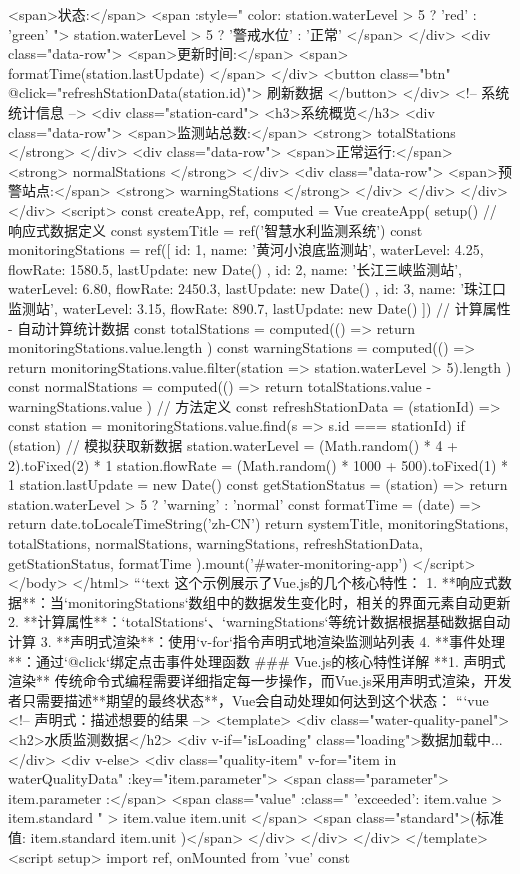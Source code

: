 {{{{{<span>状态:</span> <span :style="{ color: station.waterLevel > 5 ? 'red' : 'green' }"> {{ station.waterLevel > 5 ? '警戒水位' : '正常' }} </span> </div> <div class="data-row"> <span>更新时间:</span> <span>{{ formatTime(station.lastUpdate) }}</span> </div> <button class="btn" @click="refreshStationData(station.id)"> 刷新数据 </button> </div> <!-- 系统统计信息 --> <div class="station-card"> <h3>系统概览</h3> <div class="data-row"> <span>监测站总数:</span> <strong>{{ totalStations }}</strong> </div> <div class="data-row"> <span>正常运行:</span> <strong>{{ normalStations }}</strong> </div> <div class="data-row"> <span>预警站点:</span> <strong>{{ warningStations }}</strong> </div> </div> </div> </div> <script> const { createApp, ref, computed } = Vue createApp({ setup() { // 响应式数据定义 const systemTitle = ref('智慧水利监测系统') const monitoringStations = ref([ { id: 1, name: '黄河小浪底监测站', waterLevel: 4.25, flowRate: 1580.5, lastUpdate: new Date() }, { id: 2, name: '长江三峡监测站', waterLevel: 6.80, flowRate: 2450.3, lastUpdate: new Date() }, { id: 3, name: '珠江口监测站', waterLevel: 3.15, flowRate: 890.7, lastUpdate: new Date() } ]) // 计算属性 - 自动计算统计数据 const totalStations = computed(() => { return monitoringStations.value.length }) const warningStations = computed(() => { return monitoringStations.value.filter(station => station.waterLevel > 5).length }) const normalStations = computed(() => { return totalStations.value - warningStations.value }) // 方法定义 const refreshStationData = (stationId) => { const station = monitoringStations.value.find(s => s.id === stationId) if (station) { // 模拟获取新数据 station.waterLevel = (Math.random() * 4 + 2).toFixed(2) * 1 station.flowRate = (Math.random() * 1000 + 500).toFixed(1) * 1 station.lastUpdate = new Date() } } const getStationStatus = (station) => { return station.waterLevel > 5 ? 'warning' : 'normal' } const formatTime = (date) => { return date.toLocaleTimeString('zh-CN') } return { systemTitle, monitoringStations, totalStations, normalStations, warningStations, refreshStationData, getStationStatus, formatTime } } }).mount('#water-monitoring-app') </script> </body> </html> ```text 这个示例展示了Vue.js的几个核心特性： 1. **响应式数据**：当`monitoringStations`数组中的数据发生变化时，相关的界面元素自动更新 2. **计算属性**：`totalStations`、`warningStations`等统计数据根据基础数据自动计算 3. **声明式渲染**：使用`v-for`指令声明式地渲染监测站列表 4. **事件处理**：通过`@click`绑定点击事件处理函数 ### Vue.js的核心特性详解 **1. 声明式渲染** 传统命令式编程需要详细指定每一步操作，而Vue.js采用声明式渲染，开发者只需要描述**期望的最终状态**，Vue会自动处理如何达到这个状态： ```vue <!-- 声明式：描述想要的结果 --> <template> <div class="water-quality-panel"> <h2>水质监测数据</h2> <div v-if="isLoading" class="loading">数据加载中...</div> <div v-else> <div class="quality-item" v-for="item in waterQualityData" :key="item.parameter"> <span class="parameter">{{ item.parameter }}:</span> <span class="value" :class="{ 'exceeded': item.value > item.standard }" > {{ item.value }} {{ item.unit }} </span> <span class="standard">(标准值: {{ item.standard }}{{ item.unit }})</span> </div> </div> </div> </template> <script setup> import { ref, onMounted } from 'vue' const }}}}}
